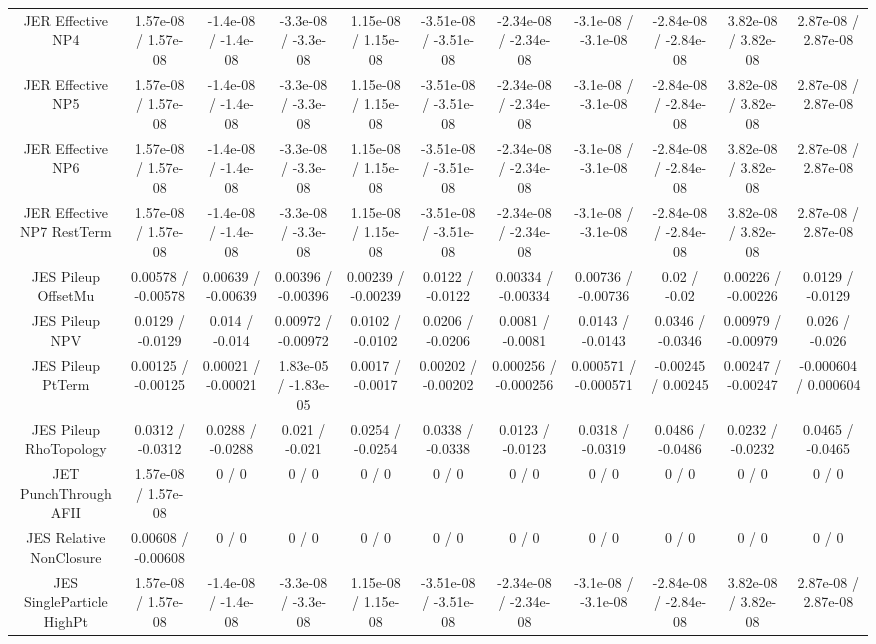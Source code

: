 \begin{table}[htbp]
\begin{center}
\begin{tabular}{|c|c|c|c|c|c|c|c|c|c|c|}
  JER Effective NP4 & 1.57e-08 / 1.57e-08 & -1.4e-08 / -1.4e-08 & -3.3e-08 / -3.3e-08 & 1.15e-08 / 1.15e-08 & -3.51e-08 / -3.51e-08 & -2.34e-08 / -2.34e-08 & -3.1e-08 / -3.1e-08 & -2.84e-08 / -2.84e-08 & 3.82e-08 / 3.82e-08 & 2.87e-08 / 2.87e-08 \\ 
  JER Effective NP5 & 1.57e-08 / 1.57e-08 & -1.4e-08 / -1.4e-08 & -3.3e-08 / -3.3e-08 & 1.15e-08 / 1.15e-08 & -3.51e-08 / -3.51e-08 & -2.34e-08 / -2.34e-08 & -3.1e-08 / -3.1e-08 & -2.84e-08 / -2.84e-08 & 3.82e-08 / 3.82e-08 & 2.87e-08 / 2.87e-08 \\ 
  JER Effective NP6 & 1.57e-08 / 1.57e-08 & -1.4e-08 / -1.4e-08 & -3.3e-08 / -3.3e-08 & 1.15e-08 / 1.15e-08 & -3.51e-08 / -3.51e-08 & -2.34e-08 / -2.34e-08 & -3.1e-08 / -3.1e-08 & -2.84e-08 / -2.84e-08 & 3.82e-08 / 3.82e-08 & 2.87e-08 / 2.87e-08 \\ 
  JER Effective NP7 RestTerm & 1.57e-08 / 1.57e-08 & -1.4e-08 / -1.4e-08 & -3.3e-08 / -3.3e-08 & 1.15e-08 / 1.15e-08 & -3.51e-08 / -3.51e-08 & -2.34e-08 / -2.34e-08 & -3.1e-08 / -3.1e-08 & -2.84e-08 / -2.84e-08 & 3.82e-08 / 3.82e-08 & 2.87e-08 / 2.87e-08 \\ 
  JES Pileup OffsetMu & 0.00578 / -0.00578 & 0.00639 / -0.00639 & 0.00396 / -0.00396 & 0.00239 / -0.00239 & 0.0122 / -0.0122 & 0.00334 / -0.00334 & 0.00736 / -0.00736 & 0.02 / -0.02 & 0.00226 / -0.00226 & 0.0129 / -0.0129 \\ 
  JES Pileup NPV & 0.0129 / -0.0129 & 0.014 / -0.014 & 0.00972 / -0.00972 & 0.0102 / -0.0102 & 0.0206 / -0.0206 & 0.0081 / -0.0081 & 0.0143 / -0.0143 & 0.0346 / -0.0346 & 0.00979 / -0.00979 & 0.026 / -0.026 \\ 
  JES Pileup PtTerm & 0.00125 / -0.00125 & 0.00021 / -0.00021 & 1.83e-05 / -1.83e-05 & 0.0017 / -0.0017 & 0.00202 / -0.00202 & 0.000256 / -0.000256 & 0.000571 / -0.000571 & -0.00245 / 0.00245 & 0.00247 / -0.00247 & -0.000604 / 0.000604 \\ 
  JES Pileup RhoTopology & 0.0312 / -0.0312 & 0.0288 / -0.0288 & 0.021 / -0.021 & 0.0254 / -0.0254 & 0.0338 / -0.0338 & 0.0123 / -0.0123 & 0.0318 / -0.0319 & 0.0486 / -0.0486 & 0.0232 / -0.0232 & 0.0465 / -0.0465 \\ 
  JET PunchThrough AFII & 1.57e-08 / 1.57e-08 & 0 / 0 & 0 / 0 & 0 / 0 & 0 / 0 & 0 / 0 & 0 / 0 & 0 / 0 & 0 / 0 & 0 / 0 \\ 
  JES Relative NonClosure & 0.00608 / -0.00608 & 0 / 0 & 0 / 0 & 0 / 0 & 0 / 0 & 0 / 0 & 0 / 0 & 0 / 0 & 0 / 0 & 0 / 0 \\ 
  JES SingleParticle HighPt & 1.57e-08 / 1.57e-08 & -1.4e-08 / -1.4e-08 & -3.3e-08 / -3.3e-08 & 1.15e-08 / 1.15e-08 & -3.51e-08 / -3.51e-08 & -2.34e-08 / -2.34e-08 & -3.1e-08 / -3.1e-08 & -2.84e-08 / -2.84e-08 & 3.82e-08 / 3.82e-08 & 2.87e-08 / 2.87e-08 \\ 

\end{tabular}
\end{center}
\end{table}

